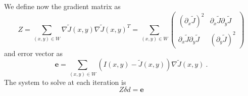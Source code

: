 \documentclass[a4paper,10pt]{article}
\begin{document}
We define now the gradient matrix as
\begin{equation}
 Z = \sum_{(x,y)\in W} \nabla \tilde J(x,y) \nabla \tilde J(x,y)^T
= \sum_{(x,y)\in W}
  \begin{pmatrix}
   (\partial_x \tilde J)^2
&  \partial_x \tilde J \partial_y\tilde J
\\ \partial_x \tilde J \partial_y\tilde J
&  (\partial_y \tilde J)^2
  \end{pmatrix}
\end{equation}
and error vector as
\begin{equation}
 \mathbf e = \sum_{(x,y)\in W} (I(x,y) - \tilde J(x,y)) \nabla \tilde J(x,y) \ .
\end{equation}
The system to solve at each iteration is
\begin{equation}
 Z \delta d = \mathbf e
\end{equation}
\end{document}
